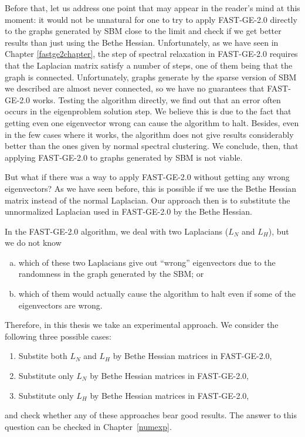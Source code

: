 Before that, let us address one point that may appear in the reader's mind at this moment: it would not be unnatural for one to try to apply FAST-GE-2.0 directly to the graphs generated by SBM close to the limit and check if we get better results than just using the Bethe Hessian.
Unfortunately, as we have seen in Chapter \ref{fastge2chapter}, the step of spectral relaxation in FAST-GE-2.0 requires that the Laplacian matrix satisfy a number of steps, one of them being that the graph is connected. Unfortunately, graphs generate by the sparse version of SBM we described are almost never connected, so we have no guarantees that FAST-GE-2.0 works.
Testing the algorithm directly, we find out that an error often occurs in the eigenproblem solution step. We believe this is due to the fact that getting even one eigenvector wrong can cause the algorithm to halt.
Besides, even in the few cases where it works, the algorithm does not give results considerably better than the ones given by normal spectral clustering.
We conclude, then, that applying FAST-GE-2.0 to graphs generated by SBM is not viable.

But what if there was a way to apply FAST-GE-2.0 without getting any wrong eigenvectors?
As we have seen before, this is possible if we use the Bethe Hessian matrix instead of the normal Laplacian.
Our approach then is to substitute the unnormalized Laplacian used in FAST-GE-2.0 by the Bethe Hessian.


In the FAST-GE-2.0 algorithm, we deal with two Laplacians ($L_N$ and $L_H$), but we do not know
\begin{enumerate}[(a)]
   \item which of these two Laplacians give out ``wrong'' eigenvectors due to the randomness in the graph generated by the SBM; or
   \item which of them would actually cause the algorithm to halt even if some of the eigenvectors are wrong.
\end{enumerate}
Therefore, in this thesis we take an experimental approach. We consider the following three possible cases:
\begin{enumerate}[(1)]
   \item Substite both $L_N$ and $L_H$ by Bethe Hessian matrices in FAST-GE-2.0,
   \item Substitute only $L_N$ by Bethe Hessian matrices in FAST-GE-2.0,
   \item Substitute only $L_H$ by Bethe Hessian matrices in FAST-GE-2.0,
\end{enumerate}
and check whether any of these approaches bear good results.
The answer to this question can be checked in Chapter~\ref{numexp}.

